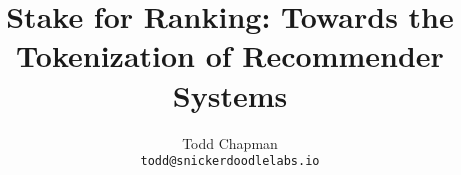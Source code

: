 \documentclass{article}
\title{Stake for Ranking: 
Towards the Tokenization of Recommender Systems}
\author{
  Todd Chapman\\
  \texttt{todd@snickerdoodlelabs.io}
  \and
}
\begin{document}
\maketitle
\pagebreak

\tableofcontents{}
\pagebreak















\end{document}
